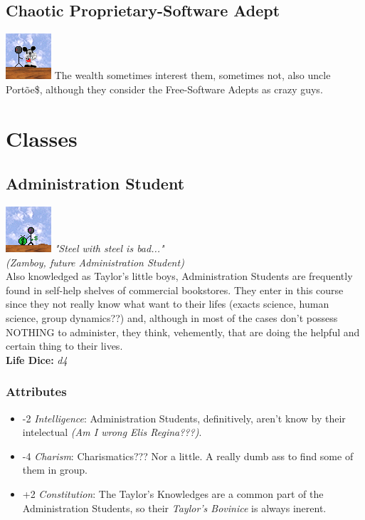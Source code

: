 \documentclass[ letterpaper,12pt]{article}
\begin{document}
\subsection{Chaotic Proprietary-Software Adept}\includegraphics{../data/alignment/Img/niquel.png} The wealth sometimes interest them, sometimes not, also uncle Portõe\$, although they consider the Free-Software Adepts as crazy guys.

\section{Classes}

\subsection{Administration Student}
\includegraphics{../data/classes/Img/administracao.png}
{\it "Steel with steel is bad..."\\(Zamboy, future Administration Student)}\\

Also knowledged as Taylor's  little boys, Administration Students are frequently found in self-help shelves of commercial bookstores. They enter in this course  since they not really know what want to their lifes (exacts science, human science, group  dynamics??) and, although in most of the cases don't possess NOTHING to administer, they think, vehemently, that are doing the helpful and certain thing to their lives.\\ 

{\bf Life Dice:} {\it d4}

\subsubsection{Attributes}
\begin{itemize}
\item{-2 {\it Intelligence}: Administration Students, definitively,  aren't know by their intelectual {\it (Am I wrong Elis Regina???)}.}
\item{-4 {\it Charism}: Charismatics??? Nor a little. A really dumb ass to find some of them in group.}
\item{+2 {\it Constitution}: The Taylor's Knowledges are a common part of the Administration Students, so their {\it Taylor's Bovinice} is always inerent.}
\end{itemize}
\end{document}
